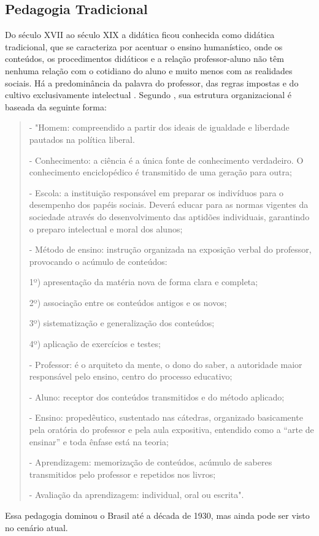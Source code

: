 \subsection{Pedagogia Tradicional}\label{sec:ped_trad}

Do século XVII ao século XIX a didática ficou conhecida como didática tradicional, que se caracteriza por acentuar o ensino humanístico, onde os conteúdos, os procedimentos didáticos e a relação professor-aluno não têm nenhuma relação com o cotidiano do aluno e muito menos com as realidades sociais. Há a predominância da palavra do professor, das regras impostas e do cultivo exclusivamente intelectual \cite{libaneo}.
Segundo \cite{larchert}, sua estrutura organizacional é baseada da seguinte forma:
\begin{quote} - "Homem: compreendido a partir dos ideais de igualdade e liberdade pautados na política liberal.

- Conhecimento: a ciência é a única fonte de conhecimento verdadeiro. O conhecimento enciclopédico é transmitido de uma geração para outra;
	
- Escola: a instituição responsável em preparar os indivíduos para o desempenho dos papéis sociais. Deverá educar para as normas vigentes da sociedade através do desenvolvimento das aptidões individuais, garantindo o preparo intelectual e moral dos alunos;
	
- Método de ensino: instrução organizada na exposição verbal do professor, provocando o acúmulo de conteúdos: 
	
	1º) apresentação da matéria nova de forma clara e completa;
	
	2º) associação entre os conteúdos antigos e os novos;
		
	3º) sistematização e generalização dos conteúdos;
	
	4º) aplicação de exercícios e testes;

- Professor: é o arquiteto da mente, o dono do saber, a autoridade maior responsável pelo ensino, centro do processo educativo;

- Aluno: receptor dos conteúdos transmitidos e do método aplicado;

- Ensino: propedêutico, sustentado nas cátedras, organizado basicamente pela oratória do professor e pela aula expositiva, entendido como a “arte de ensinar” e toda ênfase está na teoria;
	
- Aprendizagem: memorização de conteúdos, acúmulo de saberes transmitidos pelo professor e repetidos nos livros;
	
- Avaliação da aprendizagem: individual, oral ou escrita".	
\end{quote}
Essa pedagogia dominou o Brasil até a década de 1930, mas ainda pode ser visto no cenário atual.


